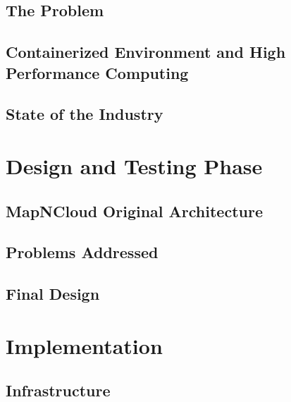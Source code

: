 \documentclass{Configuration_Files/PoliMi3i_thesis}
\begin{document}
    \section{The Problem}
		\label{se:problem}
    
	
		\section{Containerized Environment and High Performance Computing}
		\label{se:containerHPC}
    
		
		\section{State of the Industry}
		\label{se:stateoftheart}
    			
		
	\chapter{Design and Testing Phase}
	\label{ch:designandtesting}

		\section{MapNCloud Original Architecture}
		\label{se:originalarchitecture}
    

		\section{Problems Addressed}
		\label{se:problemsaddressed}
    

    \section{Final Design}
    \label{se:finaldesign}
    

	\chapter{Implementation}
	\label{ch:implementation}
    
    \section{Infrastructure}
    \label{se:infrastructure}
\end{document}
